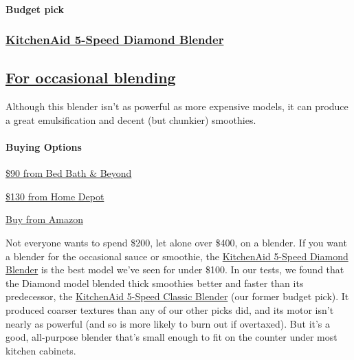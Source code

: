 \hypertarget{budget-pick}{%
\paragraph{Budget pick}\label{budget-pick}}

\href{https://www.nytimes3xbfgragh.onion/wirecutter/out/link/35968/159119/4/109197?merchant=Bed\%20Bath\%20\%26\%20Beyond}{}

\hypertarget{kitchenaid-5-speed-diamond-blender}{%
\subsubsection{\texorpdfstring{\href{https://www.nytimes3xbfgragh.onion/wirecutter/out/link/35968/159119/4/109197?merchant=Bed\%20Bath\%20\%26\%20Beyond}{KitchenAid
5-Speed Diamond
Blender}}{KitchenAid 5-Speed Diamond Blender}}\label{kitchenaid-5-speed-diamond-blender}}

\hypertarget{for-occasional-blending}{%
\subsection{\texorpdfstring{\href{https://www.nytimes3xbfgragh.onion/wirecutter/out/link/35968/159119/4/109197?merchant=Bed\%20Bath\%20\%26\%20Beyond}{For
occasional
blending}}{For occasional blending}}\label{for-occasional-blending}}

Although this blender isn't as powerful as more expensive models, it can
produce a great emulsification and decent (but chunkier) smoothies.

\hypertarget{buying-options-3}{%
\paragraph{Buying Options}\label{buying-options-3}}

\href{https://shop-links.co/1696305516080111511}{\$90 from Bed Bath \&
Beyond}

\href{https://www.nytimes3xbfgragh.onion/wirecutter/out/link/35968/159787/4/109197?merchant=Home\%20Depot}{\$130
from Home Depot}

\href{https://www.nytimes3xbfgragh.onion/wirecutter/out/link/35968/158229/4/109197?merchant=Amazon}{Buy
from Amazon}

Not everyone wants to spend \$200, let alone over \$400, on a blender.
If you want a blender for the occasional sauce or smoothie, the
\href{https://www.nytimes3xbfgragh.onion/wirecutter/out/link/35968/159119/4/109206/?merchant=Bed\%20Bath\%20\%26\%20Beyond}{KitchenAid
5-Speed Diamond Blender} is the best model we've seen for under \$100.
In our tests, we found that the Diamond model blended thick smoothies
better and faster than its predecessor, the
\href{https://www.nytimes3xbfgragh.onion/wirecutter/out/link/7763/22821/4/109199/?merchant=Amazon}{KitchenAid
5-Speed Classic Blender} (our former budget pick). It produced coarser
textures than any of our other picks did, and its motor isn't nearly as
powerful (and so is more likely to burn out if overtaxed). But it's a
good, all-purpose blender that's small enough to fit on the counter
under most kitchen cabinets.

